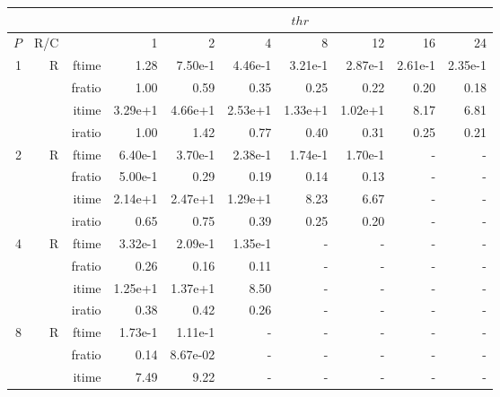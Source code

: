 \documentclass[a4paper]{article}
\begin{document}
\begin{table}[htbp]
\begin{center}
\begin{small}
\begin{tabular}{|r|r|r|r|r|r|r|r|r|r|}
\hline 
     & & & \multicolumn{7}{c|}{$thr$} \\ \hline
    $P$ & R/C &  & 1           & 2    & 4    & 8    & 12   & 16    & 24  \\ \hline\hline
   1 &  R &   ftime &    1.28  &    7.50e-1 &    4.46e-1 &    3.21e-1 &    2.87e-1 &    2.61e-1 &    2.35e-1 \\
             &             &  fratio &    1.00 &   0.59 &    0.35 &    0.25 &    0.22 &    0.20 &    0.18 \\
             &             &  itime &    3.29e+1 &   4.66e+1 &   2.53e+1 &   1.33e+1 &   1.02e+1 &   8.17  &    6.81  \\
             &             &  iratio &    1.00 &    1.42  &    0.77 &    0.40 &    0.31 &    0.25 &   0.21 \\\hline
   2 &  R &   ftime &    6.40e-1 &    3.70e-1 &    2.38e-1 &    1.74e-1 &    1.70e-1 &      - &      - \\
             &             &  fratio &    5.00e-1 &   0.29 &   0.19 &    0.14 &    0.13 &      - &      - \\
             &             &  itime &    2.14e+1 &   2.47e+1 &   1.29e+1 &   8.23  &    6.67  &      - &      - \\
             &             &  iratio &    0.65 &    0.75 &    0.39 &    0.25 &    0.20 &      - &      - \\\hline
   4 &  R &   ftime &    3.32e-1 &    2.09e-1 &    1.35e-1 &      - &      - &      - &      - \\
             &             &  fratio &    0.26 &    0.16 &   0.11 &      - &      - &      - &      - \\
             &             &  itime &    1.25e+1 &   1.37e+1 &   8.50  &      - &      - &      - &      - \\
             &             &  iratio &    0.38 &   0.42 &    0.26 &      - &      - &      - &      - \\\hline
   8 &   R &   ftime &    1.73e-1 &    1.11e-1 &      - &      - &      - &      - &      - \\
             &             &  fratio &    0.14 &    8.67e-02 &     - &      - &      - &      - &      - \\
             &             &  itime &    7.49  &    9.22  &      - &      - &      - &      - &      - \\

\end{tabular}
\end{small}
\end{center}
\end{table}
\end{document}
